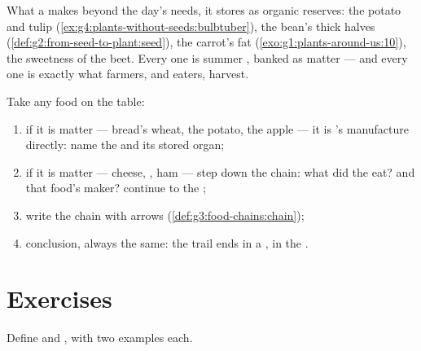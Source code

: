 \begin{example}\label{ex:g6:plants-are-producers:pantry}
What a  makes beyond the day's needs, it stores as
organic reserves: the potato  and tulip 
(\cref{ex:g4:plants-without-seeds:bulbtuber}), the bean's
thick halves (\cref{def:g2:from-seed-to-plant:seed}), the
carrot's fat  (\cref{exo:g1:plants-around-us:10}), the
sweetness of the beet. Every one is summer , banked as
matter --- and every one is exactly what farmers, and
eaters, harvest.
\end{example}

\begin{method}\label{met:g6:plants-are-producers:trace}
Take any food on the table:
\begin{enumerate}
  \item if it is  matter --- bread's wheat, the
        potato, the apple --- it is 's manufacture
        directly: name the  and its stored organ;
  \item if it is  matter --- cheese, , ham ---
        step down the chain: what did the  eat? and
        that food's maker? continue to the ;
  \item write the chain with arrows
        (\cref{def:g3:food-chains:chain});
  \item conclusion, always the same: the trail ends in a
        , in the .
\end{enumerate}
\end{method}

\section{Exercises}

\begin{exercise}[$\star$]\label{exo:g6:plants-are-producers:1}
Define  and , with two examples
each.
\end{exercise}

